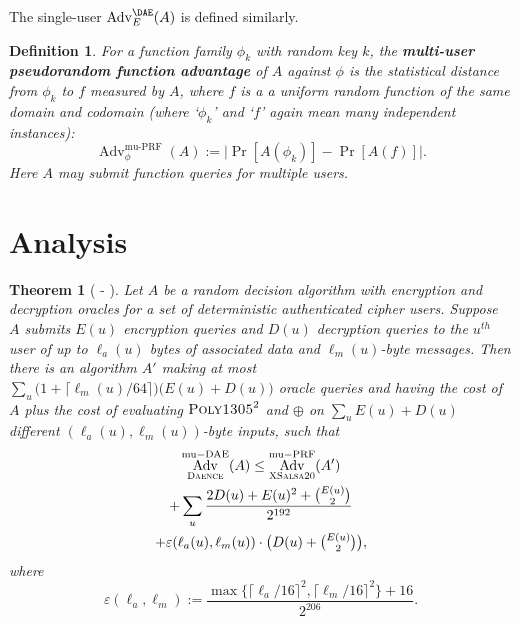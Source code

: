 \documentclass[draft]{article}
\newtheorem{definition}{Definition}
\newtheorem{theorem}{Theorem}
\newcommand{\term}[1]{\textbf{#1}}
\DeclareRobustCommand{\operatorsc}[1]{{%
  \ifmmode\let\next=\operatorname\else\let\next=\relax\fi\next{\textsc{#1}}}}
\def\Salsa#1/{\operatorsc{Salsa#1}}
\def\XSalsa#1/{\operatorsc{XSalsa#1}}
\def\Poly#1/{\operatorsc{Poly#1}}
\def\Daence/{\operatorsc{Daence}}
\DeclareMathOperator{\Adv}{Adv}
\DeclareMathOperator{\muDAE}{mu-DAE}
\DeclareMathOperator{\muPRF}{mu-PRF}
\newcommand{\collisionbound}{\varepsilon}
\begin{document}
The single-user $\Adv^{\DAE}_E(A)$ is defined similarly.

\begin{definition}
  For a function family $\phi_k$ with random key $k$, the
   \term{multi-user pseudorandom function advantage}
   of $A$ against $\phi$ is the statistical distance from $\phi_k$ to
   $f$ measured by $A$, where $f$ is a a uniform random function of
   the same domain and codomain (where `$\phi_k$' and `$f$' again
   mean many independent instances):
  \[
    \Adv^{\muPRF}_\phi(A) := \lvert\Pr[A(\phi_k)] - \Pr[A(f)]\rvert.
  \]
  Here $A$ may submit function queries for \emph{multiple} users.
\end{definition}

\section{Analysis}

\begin{theorem}[\Salsa20/-\Daence/]\label{thm-salsa20-daence}
  Let $A$ be a random decision algorithm with encryption and
   decryption oracles for a set of deterministic authenticated
   cipher users.
  Suppose $A$ submits $E(u)$ encryption queries and $D(u)$ decryption
   queries to the $u^{\mathit{th}}$ user of up to $\ell_a(u)$ bytes of
   associated data and $\ell_m(u)$-byte messages.
  Then there is an algorithm $A'$ making at most
   $\sum_u \bigl(1 + \lceil\ell_m(u)/64\rceil\bigr)
     \bigl(E(u) + D(u)\bigr)$
   oracle queries and having the cost of $A$ plus the cost of
   evaluating $\Poly1305/^2$ and $\oplus$ on
   $\sum_u E(u) + D(u)$
   different $(\ell_a(u), \ell_m(u))$-byte inputs,
   such that
%
  \begin{multline*}
    \Adv^{\muDAE}_{\Daence/}(A)
     \leq \Adv^{\muPRF}_{\XSalsa20/}(A') \\
            + \sum_u
                \frac{2 D(u) + E(u)^2 + \binom{E(u)}{2}}
                     {2^{192}} \\
                + \collisionbound(\ell_a(u), \ell_m(u))
                  \cdot
                  {\textstyle\bigl(D(u) + \binom{E(u)}{2}\bigr)},
  \end{multline*}
%
   where
  \[
    \collisionbound(\ell_a, \ell_m)
    := \frac{\max\{\lceil\ell_a/16\rceil^2, \lceil\ell_m/16\rceil^2\}
             + 16}
            {2^{206}}.
  \]
\end{theorem}
\end{document}
